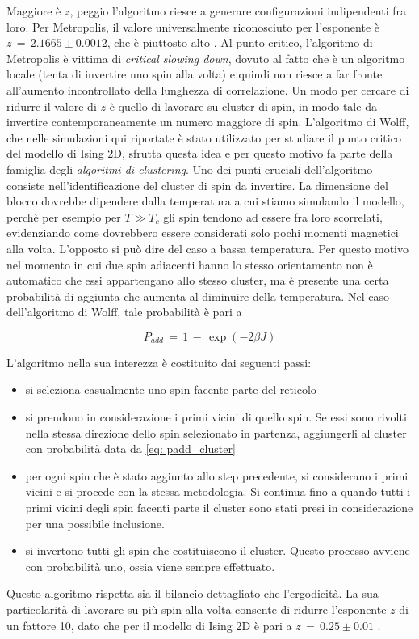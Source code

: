 Maggiore è $z$, peggio l'algoritmo riesce a generare configurazioni indipendenti fra loro. Per Metropolis, il valore universalmente 
riconosciuto per l'esponente è $z\,=\,2.1665 \pm 0.0012$, che è piuttosto alto \cite{MCM}. Al punto critico, l'algoritmo di Metropolis è vittima 
di \textit{critical slowing down}, dovuto al fatto che è un algoritmo locale (tenta di invertire uno spin alla volta) e quindi non 
riesce a far fronte all'aumento incontrollato della lunghezza di correlazione. Un modo per cercare di ridurre il valore di $z$ è quello 
di lavorare su cluster di spin, in modo tale da invertire contemporaneamente un numero maggiore di spin. L'algoritmo di Wolff, che nelle 
simulazioni qui riportate è stato utilizzato per studiare il punto critico del modello di Ising 2D, sfrutta questa idea e per questo 
motivo fa parte della famiglia degli \textit{algoritmi di clustering}. Uno dei punti cruciali dell'algoritmo consiste nell'identificazione 
del cluster di spin da invertire. La dimensione del blocco dovrebbe dipendere dalla temperatura a cui stiamo simulando il modello, perchè 
per esempio per $T \gg T_c$ gli spin tendono ad essere fra loro scorrelati, evidenziando come dovrebbero essere considerati solo pochi 
momenti magnetici alla volta. L'opposto si può dire del caso a bassa temperatura. Per questo motivo nel momento in cui due spin adiacenti 
hanno lo stesso orientamento non è automatico che essi appartengano allo stesso cluster, ma è presente una certa probabilità di aggiunta 
che aumenta al diminuire della temperatura. Nel caso dell'algoritmo di Wolff, tale probabilità è pari a 

\begin{equation}
    P_{add}\,=\,1\,-\,\exp{\left(-2\beta J\right)}
    \label{eq: padd_cluster}
\end{equation}

L'algoritmo nella sua interezza è costituito dai seguenti passi:

\begin{itemize}[label=$\diamond$] 
    \item si seleziona casualmente uno spin facente parte del reticolo
    \item si prendono in considerazione i primi vicini di quello spin. Se essi sono rivolti nella stessa direzione dello spin 
    selezionato in partenza, aggiungerli al cluster con probabilità data da \eqref{eq: padd_cluster}
    \item per ogni spin che è stato aggiunto allo step precedente, si considerano i primi vicini e si procede con la stessa metodologia. 
    Si continua fino a quando tutti i primi vicini degli spin facenti parte il cluster sono stati presi in considerazione per una possibile 
    inclusione.
    \item si invertono tutti gli spin che costituiscono il cluster. Questo processo avviene con probabilità uno, ossia viene sempre effettuato.
\end{itemize}

Questo algoritmo rispetta sia il bilancio dettagliato che l'ergodicità. La sua particolarità di lavorare su più spin alla volta consente di 
ridurre l'esponente $z$ di un fattore 10, dato che per il modello di Ising 2D è pari a $z\,=\,0.25 \pm 0.01$ \cite{MCM}.

